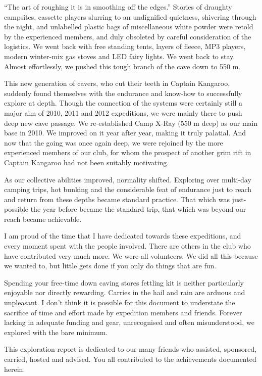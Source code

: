 ``The art of roughing it is in smoothing off the edges.'' Stories of
draughty campsites, cassette players slurring to an undignified
quietness, shivering through the night, and unlabelled plastic bags of
miscellaneous white powder were retold by the experienced members, and
duly obsoleted by careful consideration of the logistics. We went back
with free standing tents, layers of fleece, MP3 players, modern
winter-mix gas stoves and LED fairy lights. We went back to stay. Almost
effortlessly, we pushed this tough branch of the cave down to 550 m.

This new generation of cavers, who cut their teeth in Captain Kangaroo,
suddenly found themselves with the endurance and know-how to
successfully explore at depth. Though the connection of the systems were
certainly still a major aim of 2010, 2011 and 2012 expeditions, we were
mainly there to push deep new cave passage. We re-established Camp X-Ray
(550 m deep) as our main base in 2010. We improved on it year after
year, making it truly palatial. And now that the going was once again
deep, we were rejoined by the more experienced members of our club, for
whom the prospect of another grim rift in Captain Kangaroo had not been
suitably motivating.

As our collective abilities improved, normality shifted. Exploring over
multi-day camping trips, hot bunking and the considerable feat of
endurance just to reach and return from these depths became standard
practice. That which was just-possible the year before became the
standard trip, that which was beyond our reach became achievable.

I am proud of the time that I have dedicated towards these expeditions,
and every moment spent with the people involved. There are others in the
club who have contributed very much more. We were all volunteers. We did
all this because we wanted to, but little gets done if you only do
things that are fun.

Spending your free-time down caving stores fettling kit is neither
particularly enjoyable nor directly rewarding. Carries in the hail and
rain are arduous and unpleasant. I don't think it is possible for this
document to understate the sacrifice of time and effort made by
expedition members and friends. Forever lacking in adequate funding and
gear, unrecognised and often misunderstood, we explored with the bare
minimum.

This exploration report is dedicated to our many friends who assisted,
sponsored, carried, hosted and advised. You all contributed to the
achievements documented herein.

